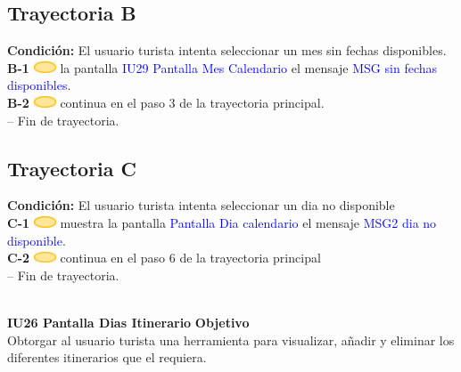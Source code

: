 \subsection{\textbf{Trayectoria B}}
\textbf{Condición:} El usuario turista intenta seleccionar un mes sin fechas disponibles.\\
\textbf{B-1} \includegraphics[width=0.0500\textwidth]{Figuras/sistema.png} la pantalla \textcolor{blue}{IU29 Pantalla Mes Calendario} el mensaje \textcolor{blue}{MSG sin fechas disponibles.} \\
\textbf{B-2} \includegraphics[width=0.0500\textwidth]{Figuras/sistema.png} continua en el paso 3 de la trayectoria principal.\\
-- Fin de trayectoria.\par

\subsection{\textbf{Trayectoria C}}
\textbf{Condición:} El usuario turista intenta seleccionar un dia no disponible\\

\textbf{C-1} \includegraphics[width=0.0500\textwidth]{Figuras/sistema.png} muestra la pantalla \textcolor{blue}{Pantalla Dia calendario} el mensaje \textcolor{blue}{MSG2 dia no disponible.} \\
\textbf{C-2} \includegraphics[width=0.0500\textwidth]{Figuras/sistema.png} continua en el paso 6 de la trayectoria principal\\
-- Fin de trayectoria.\par\\

\textbf{IU26 Pantalla Dias Itinerario}
\textbf{Objetivo}\\
Obtorgar al usuario turista una herramienta para visualizar, añadir y eliminar los diferentes itinerarios que el requiera.\\

